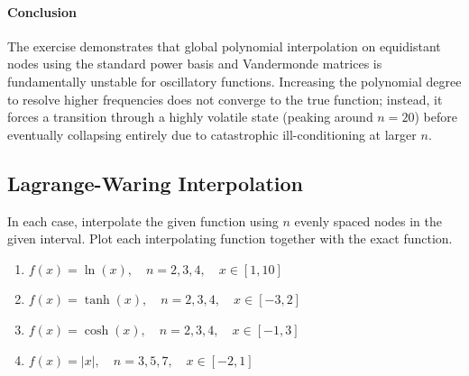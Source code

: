\begin{solution}
	\paragraph{Conclusion}
	The exercise demonstrates that global polynomial interpolation on equidistant
	nodes using the standard power basis and Vandermonde matrices is fundamentally
	unstable for oscillatory functions. Increasing the polynomial degree to resolve
	higher frequencies does not converge to the true function; instead, it forces a
	transition through a highly volatile state (peaking around $n=20$) before
	eventually collapsing entirely due to catastrophic ill-conditioning at larger
	$n$.

\end{solution}

\subsection{Lagrange-Waring Interpolation}

\begin{exercise}
	In each case, interpolate the given function using \( n \) evenly spaced
	nodes in the given interval. Plot each interpolating function together with the
	exact function.
	\begin{enumerate}
		\item \( f(x) = \ln (x), \quad n = 2,3,4, \quad x\in [1,10] \)
		\item \( f(x) = \tanh (x), \quad n = 2,3,4, \quad x \in [-3,2] \)
		\item \( f(x) = \cosh (x), \quad n = 2,3,4, \quad x \in [-1,3] \)
		\item \( f(x) = |x|, \quad n = 3,5,7, \quad x \in [-2,1] \)
	\end{enumerate}
\end{exercise}


